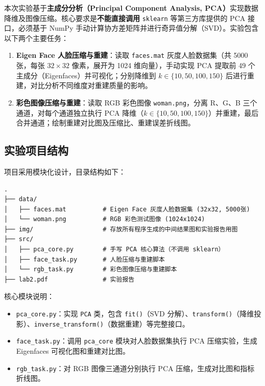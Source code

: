 \documentclass[a4paper]{article}
\begin{document}
本次实验基于\textbf{主成分分析（Principal Component Analysis, PCA）}实现数据降维及图像压缩。核心要求是\textbf{不能直接调用} \texttt{sklearn} 等第三方库提供的 PCA 接口，必须基于 NumPy 手动计算协方差矩阵并进行奇异值分解（SVD）。实验包含以下两个主要任务：

\begin{enumerate}
    \item \textbf{Eigen Face 人脸压缩与重建}：读取 \texttt{faces.mat} 灰度人脸数据集（共 5000 张，每张 $32 \times 32$ 像素，展开为 1024 维向量），手动实现 PCA 提取前 49 个主成分（Eigenfaces）并可视化；分别降维到 $k \in \{10, 50, 100, 150\}$ 后进行重建，对比分析不同维度对重建质量的影响。
    \item \textbf{彩色图像压缩与重建}：读取 RGB 彩色图像 \texttt{woman.png}，分离 R、G、B 三个通道，对每个通道独立执行 PCA 降维（$k \in \{10, 50, 100, 150\}$）并重建，最后合并通道；绘制重建对比图及压缩比、重建误差折线图。
\end{enumerate}

\subsection{实验项目结构}

项目采用模块化设计，目录结构如下：

\begin{verbatim}
.
├── data/
│   ├── faces.mat          # Eigen Face 灰度人脸数据集 (32x32, 5000张)
│   └── woman.png          # RGB 彩色测试图像 (1024x1024)
├── img/                   # 存放所有程序生成的中间结果图和实验报告用图
├── src/
│   ├── pca_core.py        # 手写 PCA 核心算法（不调用 sklearn）
│   ├── face_task.py       # 人脸压缩与重建脚本
│   └── rgb_task.py        # 彩色图像压缩与重建脚本
├── lab2.pdf               # 实验报告

\end{verbatim}

核心模块说明：
\begin{itemize}
    \item \texttt{pca\_core.py}：实现 \texttt{PCA} 类，包含 \texttt{fit()}（SVD 分解）、\texttt{transform()}（降维投影）、\texttt{inverse\_transform()}（数据重建）等完整接口。
    \item \texttt{face\_task.py}：调用 \texttt{pca\_core} 模块对人脸数据集执行 PCA 压缩实验，生成 Eigenfaces 可视化图和重建对比图。
    \item \texttt{rgb\_task.py}：对 RGB 图像三通道分别执行 PCA 压缩，生成对比图和指标折线图。
\end{itemize}
\end{document}
